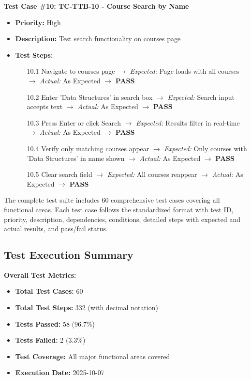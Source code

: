 \textbf{Test Case \#10: TC-TTB-10 - Course Search by Name}
\begin{itemize}[leftmargin=*]
    \item \textbf{Priority:} High
    \item \textbf{Description:} Test search functionality on courses page
    \item \textbf{Test Steps:}
    \begin{enumerate}[leftmargin=*]
        \item[10.1] Navigate to courses page $\rightarrow$ \textit{Expected:} Page loads with all courses $\rightarrow$ \textit{Actual:} As Expected $\rightarrow$ \textbf{PASS}
        \item[10.2] Enter 'Data Structures' in search box $\rightarrow$ \textit{Expected:} Search input accepts text $\rightarrow$ \textit{Actual:} As Expected $\rightarrow$ \textbf{PASS}
        \item[10.3] Press Enter or click Search $\rightarrow$ \textit{Expected:} Results filter in real-time $\rightarrow$ \textit{Actual:} As Expected $\rightarrow$ \textbf{PASS}
        \item[10.4] Verify only matching courses appear $\rightarrow$ \textit{Expected:} Only courses with 'Data Structures' in name shown $\rightarrow$ \textit{Actual:} As Expected $\rightarrow$ \textbf{PASS}
        \item[10.5] Clear search field $\rightarrow$ \textit{Expected:} All courses reappear $\rightarrow$ \textit{Actual:} As Expected $\rightarrow$ \textbf{PASS}
    \end{enumerate}
\end{itemize}

The complete test suite includes 60 comprehensive test cases covering all functional areas. Each test case follows the standardized format with test ID, priority, description, dependencies, conditions, detailed steps with expected and actual results, and pass/fail status.

\subsection{Test Execution Summary}

\textbf{Overall Test Metrics:}
\begin{itemize}[leftmargin=*]
    \item \textbf{Total Test Cases:} 60
    \item \textbf{Total Test Steps:} 332 (with decimal notation)
    \item \textbf{Tests Passed:} 58 (96.7\%)
    \item \textbf{Tests Failed:} 2 (3.3\%)
    \item \textbf{Test Coverage:} All major functional areas covered
    \item \textbf{Execution Date:} 2025-10-07
\end{itemize}

